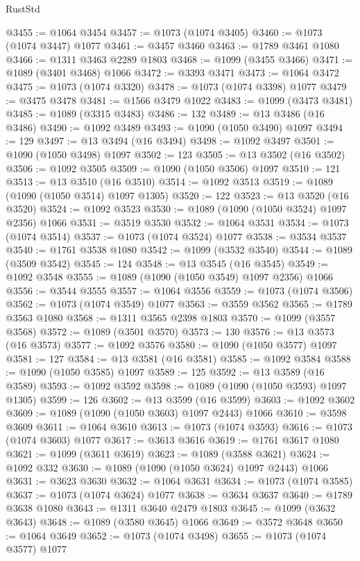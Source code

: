 \begin{lexlean}{RustStd}
\begin{coremodule}
@3455 := @1064 @3454
@3457 := @1073 (@1074 @3405)
@3460 := @1073 (@1074 @3447) @1077
@3461 := @3457 @3460
@3463 := @1789 @3461 @1080
@3466 := @1311 @3463 @2289 @1803
@3468 := @1099 (@3455 @3466)
@3471 := @1089 (@3401 @3468) @1066
@3472 := @3393 @3471
@3473 := @1064 @3472
@3475 := @1073 (@1074 @3320)
@3478 := @1073 (@1074 @3398) @1077
@3479 := @3475 @3478
@3481 := @1566 @3479 @1022
@3483 := @1099 (@3473 @3481)
@3485 := @1089 (@3315 @3483)
@3486 := 132
@3489 := @13 @3486 (@16 @3486)
@3490 := @1092 @3489
@3493 := @1090 (@1050 @3490) @1097
@3494 := 129
@3497 := @13 @3494 (@16 @3494)
@3498 := @1092 @3497
@3501 := @1090 (@1050 @3498) @1097
@3502 := 123
@3505 := @13 @3502 (@16 @3502)
@3506 := @1092 @3505
@3509 := @1090 (@1050 @3506) @1097
@3510 := 121
@3513 := @13 @3510 (@16 @3510)
@3514 := @1092 @3513
@3519 := @1089 (@1090 (@1050 @3514) @1097 @1305)
@3520 := 122
@3523 := @13 @3520 (@16 @3520)
@3524 := @1092 @3523
@3530 := @1089 (@1090 (@1050 @3524) @1097 @2356) @1066
@3531 := @3519 @3530
@3532 := @1064 @3531
@3534 := @1073 (@1074 @3514)
@3537 := @1073 (@1074 @3524) @1077
@3538 := @3534 @3537
@3540 := @1761 @3538 @1080
@3542 := @1099 (@3532 @3540)
@3544 := @1089 (@3509 @3542)
@3545 := 124
@3548 := @13 @3545 (@16 @3545)
@3549 := @1092 @3548
@3555 := @1089 (@1090 (@1050 @3549) @1097 @2356) @1066
@3556 := @3544 @3555
@3557 := @1064 @3556
@3559 := @1073 (@1074 @3506)
@3562 := @1073 (@1074 @3549) @1077
@3563 := @3559 @3562
@3565 := @1789 @3563 @1080
@3568 := @1311 @3565 @2398 @1803
@3570 := @1099 (@3557 @3568)
@3572 := @1089 (@3501 @3570)
@3573 := 130
@3576 := @13 @3573 (@16 @3573)
@3577 := @1092 @3576
@3580 := @1090 (@1050 @3577) @1097
@3581 := 127
@3584 := @13 @3581 (@16 @3581)
@3585 := @1092 @3584
@3588 := @1090 (@1050 @3585) @1097
@3589 := 125
@3592 := @13 @3589 (@16 @3589)
@3593 := @1092 @3592
@3598 := @1089 (@1090 (@1050 @3593) @1097 @1305)
@3599 := 126
@3602 := @13 @3599 (@16 @3599)
@3603 := @1092 @3602
@3609 := @1089 (@1090 (@1050 @3603) @1097 @2443) @1066
@3610 := @3598 @3609
@3611 := @1064 @3610
@3613 := @1073 (@1074 @3593)
@3616 := @1073 (@1074 @3603) @1077
@3617 := @3613 @3616
@3619 := @1761 @3617 @1080
@3621 := @1099 (@3611 @3619)
@3623 := @1089 (@3588 @3621)
@3624 := @1092 @332
@3630 := @1089 (@1090 (@1050 @3624) @1097 @2443) @1066
@3631 := @3623 @3630
@3632 := @1064 @3631
@3634 := @1073 (@1074 @3585)
@3637 := @1073 (@1074 @3624) @1077
@3638 := @3634 @3637
@3640 := @1789 @3638 @1080
@3643 := @1311 @3640 @2479 @1803
@3645 := @1099 (@3632 @3643)
@3648 := @1089 (@3580 @3645) @1066
@3649 := @3572 @3648
@3650 := @1064 @3649
@3652 := @1073 (@1074 @3498)
@3655 := @1073 (@1074 @3577) @1077

\end{coremodule}
\end{lexlean}
